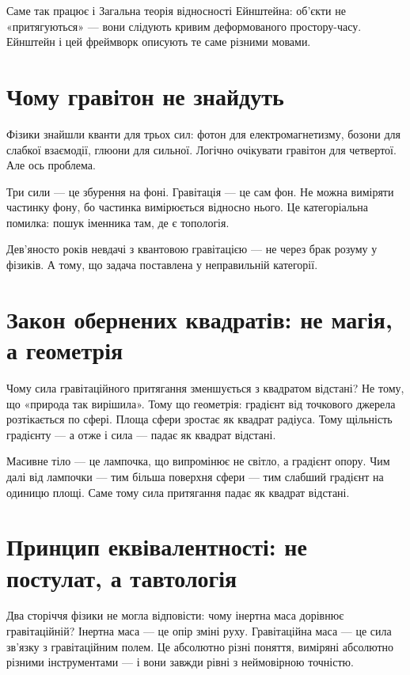 \documentclass[12pt, a4paper, openany]{book}
\begin{document}
Саме так працює і Загальна теорія відносності Ейнштейна: об'єкти не «притягуються» --- вони слідують кривим деформованого простору-часу. Ейнштейн і цей фреймворк описують те саме різними мовами.

\section{Чому гравітон не знайдуть}

Фізики знайшли кванти для трьох сил: фотон для електромагнетизму, бозони для слабкої взаємодії, глюони для сильної. Логічно очікувати гравітон для четвертої. Але ось проблема.

Три сили --- це збурення на фоні. Гравітація --- це сам фон. Не можна виміряти частинку фону, бо частинка вимірюється відносно нього. Це категоріальна помилка: пошук іменника там, де є топологія.

Дев'яносто років невдачі з квантовою гравітацією --- не через брак розуму у фізиків. А тому, що задача поставлена у неправильній категорії.

\section{Закон обернених квадратів: не магія, а геометрія}

Чому сила гравітаційного притягання зменшується з квадратом відстані? Не тому, що «природа так вирішила». Тому що геометрія: градієнт від точкового джерела розтікається по сфері. Площа сфери зростає як квадрат радіуса. Тому щільність градієнту --- а отже і сила --- падає як квадрат відстані.

\begin{analogybox}
Масивне тіло --- це лампочка, що випромінює не світло, а градієнт опору. Чим далі від лампочки --- тим більша поверхня сфери --- тим слабший градієнт на одиницю площі. Саме тому сила притягання падає як квадрат відстані.
\end{analogybox}

\section{Принцип еквівалентності: не постулат, а тавтологія}

Два сторіччя фізики не могла відповісти: чому інертна маса дорівнює гравітаційній? Інертна маса --- це опір зміні руху. Гравітаційна маса --- це сила зв'язку з гравітаційним полем. Це абсолютно різні поняття, виміряні абсолютно різними інструментами --- і вони завжди рівні з неймовірною точністю.
\end{document}
